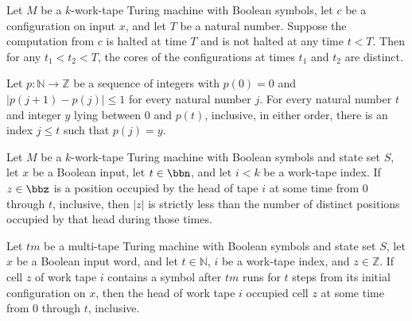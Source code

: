 \begin{lemma}
\label{Turing.MultiTapeTM.ConfigCount.core_injOn}
\leanok
{}
Let $M$ be a $k$-work-tape Turing machine with Boolean symbols, let $c$ be a
configuration on input $x$, and let $T$ be a natural number. Suppose the computation
from $c$ is halted at time $T$ and is not halted at any time $t<T$. Then for any
$t_1<t_2<T$, the cores of the configurations at times $t_1$ and $t_2$ are distinct.
\end{lemma}

\begin{lemma}
\label{Turing.MultiTapeTM.ConfigCount.exists_eq_of_between}
\leanok
{}
Let $p:\mathbb{N}\to\mathbb{Z}$ be a sequence of integers with $p(0)=0$ and
$|p(j+1)-p(j)|\le 1$ for every natural number $j$. For every natural number $t$ and
integer $y$ lying between $0$ and $p(t)$, inclusive, in either order, there is an index
$j\le t$ such that $p(j)=y$.
\end{lemma}

\begin{lemma}
\label{Turing.MultiTapeTM.abs_pos_lt_card_visited}
\leanok
{}
Let $M$ be a $k$-work-tape Turing machine with Boolean symbols and state set $S$, let
$x$ be a Boolean input, let $t\in\bbn$, and let $i<k$ be a work-tape index. If
$z\in\bbz$ is a position occupied by the head of tape $i$ at some time from $0$ through
$t$, inclusive, then $|z|$ is strictly less than the number of distinct positions
occupied by that head during those times.
\end{lemma}

\begin{lemma}
\label{Turing.MultiTapeTM.mem_visited_of_ne_none}
\leanok
{}
Let $tm$ be a multi-tape Turing machine with Boolean symbols and state set $S$, let $x$
be a Boolean input word, and let $t\in\mathbb{N}$, $i$ be a work-tape index, and
$z\in\mathbb{Z}$. If cell $z$ of work tape $i$ contains a symbol after $tm$ runs for
$t$ steps from its initial configuration on $x$, then the head of work tape $i$ occupied
cell $z$ at some time from $0$ through $t$, inclusive.
\end{lemma}


